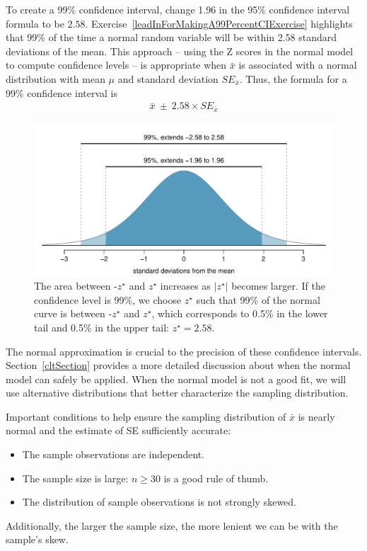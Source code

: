 To create a 99\% confidence interval, change 1.96 in the 95\% confidence interval formula to be $2.58$. Exercise~\ref{leadInForMakingA99PercentCIExercise} highlights that 99\% of the time a normal random variable will be within 2.58 standard deviations of the mean. This approach -- using the Z scores in the normal model to compute confidence levels -- is appropriate when $\bar{x}$ is associated with a normal distribution with mean $\mu$ and standard deviation $SE_{\bar{x}}$. Thus, the formula for a 99\% confidence interval is
\begin{eqnarray}
\bar{x}\ \pm\ 2.58\times SE_{\bar{x}}
\label{99PercCIForMean}
\end{eqnarray}

\begin{figure}
\centering
\includegraphics[width=\textwidth]{04/figures/choosingZForCI/choosingZForCI}
\caption{The area between -$z^{\star}$ and $z^{\star}$ increases as $|z^{\star}|$ becomes larger. If the confidence level is 99\%, we choose $z^{\star}$ such that 99\% of the normal curve is between -$z^{\star}$ and $z^{\star}$, which corresponds to 0.5\% in the lower tail and 0.5\% in the upper tail: $z^{\star}=2.58$.}
\label{choosingZForCI}
\end{figure}

The normal approximation is crucial to the precision of these confidence intervals. Section~\ref{cltSection} provides a more detailed discussion about when the normal model can safely be applied. When the normal model is not a good fit, we will use alternative distributions that better characterize the sampling distribution.

\begin{termBox}{
Important conditions to help ensure the sampling distribution of $\bar{x}$ is nearly normal and the estimate of SE sufficiently accurate:
\begin{itemize}
\item The sample observations are independent.
\item The sample size is large: $n\geq30$ is a good rule of thumb.
\item The distribution of sample observations is not strongly skewed.
\end{itemize}
Additionally, the larger the sample size, the more lenient we can be with the sample's skew.}
\end{termBox}

